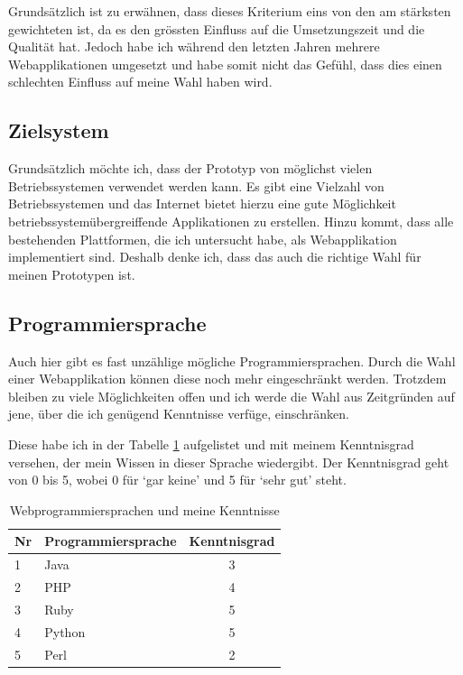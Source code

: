 Grundsätzlich ist zu erwähnen, dass dieses Kriterium eins von den am stärksten
gewichteten ist, da es den grössten Einfluss auf die Umsetzungszeit und die
Qualität hat. Jedoch habe ich während den letzten Jahren mehrere Webapplikationen
umgesetzt und habe somit nicht das Gefühl, dass dies einen schlechten Einfluss
auf meine Wahl haben wird. 
 
\subsection{Zielsystem}
Grundsätzlich möchte ich, dass der Prototyp von möglichst vielen Betriebssystemen
verwendet werden kann. Es gibt eine Vielzahl von Betriebssystemen \cite{betriebssysteme}
und das Internet bietet hierzu eine gute Möglichkeit betriebssystemübergreiffende
Applikationen zu erstellen. Hinzu kommt, dass alle bestehenden Plattformen,
die ich untersucht habe, als Webapplikation implementiert sind. Deshalb denke ich, 
dass das auch die richtige Wahl für meinen Prototypen ist.

\subsection{Programmiersprache}
Auch hier gibt es fast unzählige mögliche Programmiersprachen. Durch die Wahl
einer Webapplikation können diese noch mehr eingeschränkt werden. Trotzdem 
bleiben zu viele Möglichkeiten offen \cite{programmiersprachen} und ich werde 
die Wahl aus Zeitgründen auf jene, über die ich genügend Kenntnisse verfüge, 
einschränken.

Diese habe ich in der Tabelle \ref{tab:programmiersprachen} aufgelistet und 
mit meinem Kenntnisgrad versehen, der mein Wissen in dieser Sprache wiedergibt.
Der Kenntnisgrad geht von 0 bis 5, wobei 0 für `gar keine' und 5 für `sehr gut'
steht.

\begin{table}[h]
\begin{center}
    \begin{tabular}{llc}
        \toprule Nr & Programmiersprache & Kenntnisgrad \\
        \midrule 1 & Java & 3 \\
        \midrule 2 & PHP & 4 \\
        \midrule 3 & Ruby & 5 \\
        \midrule 4 & Python & 5 \\
        \midrule 5 & Perl & 2 \\
        \bottomrule
    \end{tabular}
    \caption{Webprogrammiersprachen und meine Kenntnisse}
    \label{tab:programmiersprachen}
\end{center}
\end{table}

